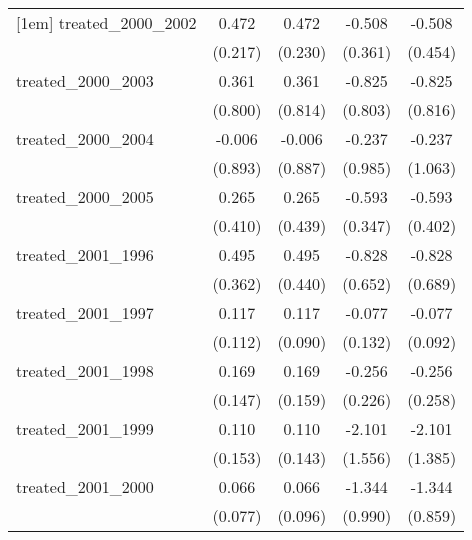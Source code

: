 {\begin{tabular}{l*{4}{c}}
[1em]
treated\_2000\_2002&       0.472\sym{*}  &       0.472\sym{*}  &      -0.508         &      -0.508         \\
            &     (0.217)         &     (0.230)         &     (0.361)         &     (0.454)         \\
[1em]
treated\_2000\_2003&       0.361         &       0.361         &      -0.825         &      -0.825         \\
            &     (0.800)         &     (0.814)         &     (0.803)         &     (0.816)         \\
[1em]
treated\_2000\_2004&      -0.006         &      -0.006         &      -0.237         &      -0.237         \\
            &     (0.893)         &     (0.887)         &     (0.985)         &     (1.063)         \\
[1em]
treated\_2000\_2005&       0.265         &       0.265         &      -0.593         &      -0.593         \\
            &     (0.410)         &     (0.439)         &     (0.347)         &     (0.402)         \\
[1em]
treated\_2001\_1996&       0.495         &       0.495         &      -0.828         &      -0.828         \\
            &     (0.362)         &     (0.440)         &     (0.652)         &     (0.689)         \\
[1em]
treated\_2001\_1997&       0.117         &       0.117         &      -0.077         &      -0.077         \\
            &     (0.112)         &     (0.090)         &     (0.132)         &     (0.092)         \\
[1em]
treated\_2001\_1998&       0.169         &       0.169         &      -0.256         &      -0.256         \\
            &     (0.147)         &     (0.159)         &     (0.226)         &     (0.258)         \\
[1em]
treated\_2001\_1999&       0.110         &       0.110         &      -2.101         &      -2.101         \\
            &     (0.153)         &     (0.143)         &     (1.556)         &     (1.385)         \\
[1em]
treated\_2001\_2000&       0.066         &       0.066         &      -1.344         &      -1.344         \\
            &     (0.077)         &     (0.096)         &     (0.990)         &     (0.859)         \\

\end{tabular}}
